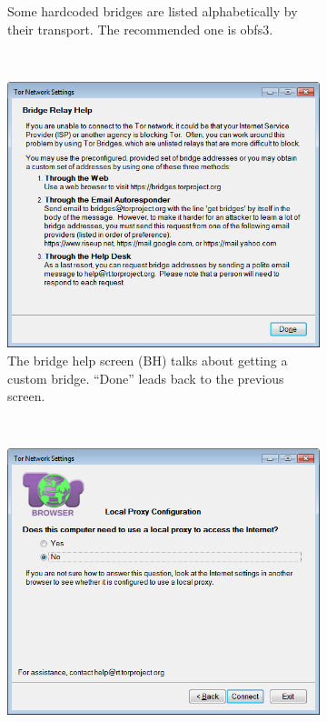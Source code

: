 \documentclass[USenglish,oneside,twocolumn]{article}
\begin{document}
\begin{figure}
\begin{subfigure}[b]{0.30\textwidth}
	\centering\captionsetup{width=1.5\linewidth}%
	\caption{Some hardcoded bridges are listed alphabetically by their transport. The recommended one is obfs3.}
	\label{fig:old-bridge-combobox}
\end{subfigure}
~~~~~~~~~~
\begin{subfigure}[b]{0.30\textwidth}
	\includegraphics[width=\textwidth]{screenshots/OLD-bridgeHelp.png}
	\centering\captionsetup{width=1.5\linewidth}%
	\caption{The bridge help screen (BH) talks about getting a custom bridge. ``Done'' leads back to the previous screen.}
	\label{fig:old-bridge-help}
\end{subfigure}
~~~~~~~~~~~~~~~~~~~~~~~~~
\begin{subfigure}[b]{0.30\textwidth}
	\includegraphics[width=\textwidth]{screenshots/OLD-proxy.png}

\end{subfigure}
\end{figure}
\end{document}
